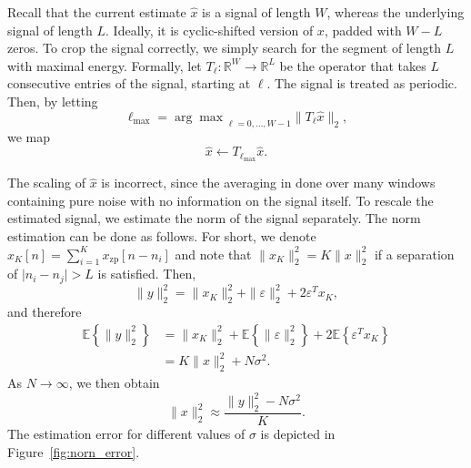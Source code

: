 \documentclass[journal]{IEEEtran}
\numberwithin{equation}{section}
\numberwithin{figure}{section}
\theoremstyle{plain}
\theoremstyle{definition}
\theoremstyle{remark}
\theoremstyle{plain}
\theoremstyle{remark}
\theoremstyle{plain}
\theoremstyle{plain}
\newcommand{\RL}{\mathbb{R}^L}
\newcommand{\RW}{\mathbb{R}^W}
\newcommand{\E}[1]{\mathbb{E}\left\{{#1} \right\}}
\newcommand{\xz}{x_{\textrm{zp}}}
\begin{document}
Recall that the current estimate $\hat{x}$ is a signal of length $W$, whereas the underlying signal of length $L$.
Ideally, it is cyclic-shifted version of $x$, padded with $W-L$ zeros.
 To crop the signal correctly, we simply search for the  segment of length $L$ with maximal energy. Formally, let  $T_\ell:\RW\to\RL$ be the operator that takes $L$ consecutive entries of the signal, starting at $\ell$. The signal is treated as periodic.   
Then, by letting
\begin{equation}
\ell_{\max} =  {\arg\max}_{\ell=0,\ldots,W-1} \|T_\ell\hat{x} \|_2,
\end{equation}
we map
\begin{equation} \label{eq:align}
\hat{x}\gets T_{\ell_{\max}}\hat{x}.
\end{equation}


The scaling of $\hat{x}$ is incorrect, since the averaging in done over many windows containing pure noise with no information on the signal itself. 
To rescale the estimated signal, we estimate the norm of the signal separately.
The norm estimation can be done as follows. For short, we denote $x_K[n]=\sum_{i=1}^K \xz[n-n_i]$ and note that $\|x_K\|_2^2 = K\|x\|_2^2$ if a separation of $\vert n_i - n_j\vert >L$ is satisfied. 
Then,
\begin{equation}
\| y\|_2^2 =  \| x_K\|_2^2 + \|\varepsilon\|_2^2 + 2\varepsilon^Tx_K, 
\end{equation}  
and therefore 
\begin{equation}
\begin{split}
\E{\| y\|_2^2} &=  \| x_K\|_2^2 + \E{\|\varepsilon\|_2^2} + 2\E{\varepsilon^Tx_K} \\ 
&= K\|x\|_2^2 + N\sigma^2. 
\end{split}	 
\end{equation}   
As $N\to\infty$,  we then obtain
\begin{equation} \label{eq:norm_estimation}
\|x\|_2^2 \approx \frac{\| y\|_2^2 - N\sigma^2}{K}. 
\end{equation}
The estimation error for different values of $\sigma$ is depicted in Figure~\ref{fig:norn_error}. 
\end{document}
